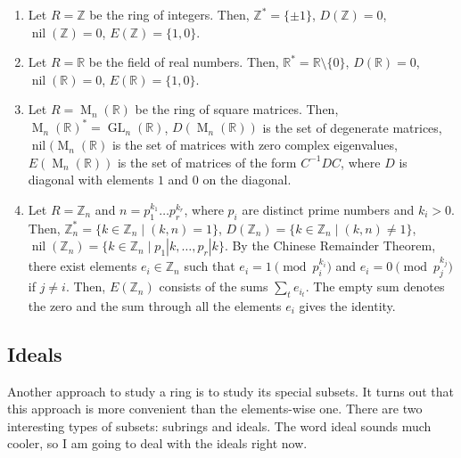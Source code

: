 \begin{examples}
\begin{enumerate}
\item Let $R = \mathbb Z$ be the ring of integers.
Then, $\mathbb Z^* = \{\pm 1\}$, $D(\mathbb Z) = 0$, $\operatorname{nil}(\mathbb Z) =  0$, $E(\mathbb Z) = \{1, 0\}$.

\item Let $R = \mathbb R$ be the field of real numbers.
Then, $\mathbb R^* = \mathbb R\setminus\{0\}$, $D(\mathbb R) = 0$, $\operatorname{nil}(\mathbb R) = 0$, $E(\mathbb R) = \{1, 0\}$.

\item Let $R = \operatorname{M}_n(\mathbb R)$ be the ring of square matrices.
Then, $\operatorname{M}_n(\mathbb R)^* = \operatorname{GL}_n(\mathbb R)$, $D(\operatorname{M}_n(\mathbb R))$ is the set of degenerate matrices, $\operatorname{nil}(\operatorname{M}_n(\mathbb R)$ is the set of matrices with zero complex eigenvalues, $E(\operatorname{M}_n(\mathbb R))$ is the set of matrices of the form $C^{-1}DC$, where $D$ is diagonal with elements $1$ and $0$ on the diagonal.

\item Let $R = \mathbb Z_n$ and $n = p_1^{k_1}\ldots p_r^{k_r}$, where $p_i$ are distinct prime numbers and $k_i > 0$.
Then, $\mathbb Z_n^* = \{k\in \mathbb Z_n\mid (k, n) = 1\}$, $D(\mathbb Z_n) = \{k\in \mathbb Z_n\mid (k, n) \neq 1\}$, $\operatorname{nil}(\mathbb Z_n) = \{k\in \mathbb Z_n\mid p_1|k,\ldots,p_r|k\}$.
By the Chinese Remainder Theorem, there exist elements $e_i\in \mathbb Z_n$ such that $e_i = 1 \pmod{p_i^{k_i}}$ and $e_i = 0\pmod{p_j^{k_j}}$ if $j\neq i$.
Then, $E(\mathbb Z_n)$ consists of the sums $\sum_{t} e_{i_t}$.
The empty sum denotes the zero and the sum through all the elements $e_i$ gives the identity.
\end{enumerate}
\end{examples}

\subsection{Ideals}

Another approach to study a ring is to study its special subsets.
It turns out that this approach is more convenient than the elements-wise one.
There are two interesting types of subsets: subrings and ideals.
The word ideal sounds much cooler, so I am going to deal with the ideals right now.

